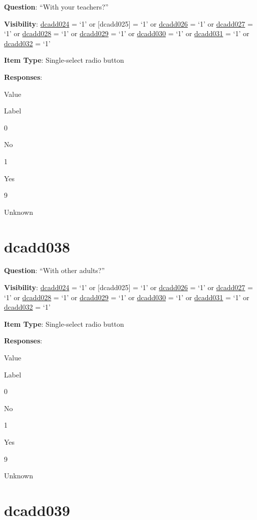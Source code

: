 \documentclass[]{book}
\begin{document}
\textbf{Question}: ``With your teachers?''

\textbf{Visibility}: \protect\hyperlink{dcadd024}{dcadd024} = `1' or {[}dcadd025{]} = `1' or \protect\hyperlink{dcadd026}{dcadd026} = `1' or \protect\hyperlink{dcadd027}{dcadd027} = `1' or \protect\hyperlink{dcadd028}{dcadd028} = `1' or \protect\hyperlink{dcadd029}{dcadd029} = `1' or \protect\hyperlink{dcadd030}{dcadd030} = `1' or \protect\hyperlink{dcadd031}{dcadd031} = `1' or \protect\hyperlink{dcadd032}{dcadd032} = `1'

\textbf{Item Type}: Single-select radio button

\textbf{Responses}:

Value

Label

0

No

1

Yes

9

Unknown

\hypertarget{dcadd038}{%
\section{dcadd038}\label{dcadd038}}

\textbf{Question}: ``With other adults?''

\textbf{Visibility}: \protect\hyperlink{dcadd024}{dcadd024} = `1' or {[}dcadd025{]} = `1' or \protect\hyperlink{dcadd026}{dcadd026} = `1' or \protect\hyperlink{dcadd027}{dcadd027} = `1' or \protect\hyperlink{dcadd028}{dcadd028} = `1' or \protect\hyperlink{dcadd029}{dcadd029} = `1' or \protect\hyperlink{dcadd030}{dcadd030} = `1' or \protect\hyperlink{dcadd031}{dcadd031} = `1' or \protect\hyperlink{dcadd032}{dcadd032} = `1'

\textbf{Item Type}: Single-select radio button

\textbf{Responses}:

Value

Label

0

No

1

Yes

9

Unknown

\hypertarget{dcadd039}{%
\section{dcadd039}\label{dcadd039}}
\end{document}

